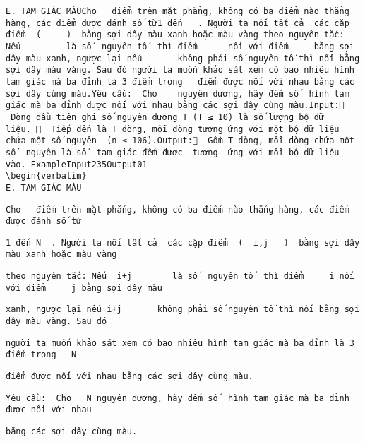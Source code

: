 
\begin{verbatim}
E. TAM GIÁC MÀUCho   điểm trên mặt phẳng, không có ba điểm nào thẳng hàng, các điểm được đánh số từ1 đến   . Người ta nối tất cả  các cặp điểm  (     )  bằng sợi dây màu xanh hoặc màu vàng theo nguyên tắc: Nếu         là số  nguyên tố  thì điểm      nối với điểm     bằng sợi dây màu xanh, ngược lại nếu       không phải số nguyên tố thì nối bằng sợi dây màu vàng. Sau đó người ta muốn khảo sát xem có bao nhiêu hình tam giác mà ba đỉnh là 3 điểm trong   điểm được nối với nhau bằng các sợi dây cùng màu.Yêu cầu:  Cho    nguyên dương, hãy đếm số  hình tam giác mà ba đỉnh được nối với nhau bằng các sợi dây cùng màu.Input:  Dòng đầu tiên ghi số nguyên dương T (T ≤ 10) là số lượng bộ dữ liệu.   Tiếp đến là T dòng, mỗi dòng tương ứng với một bộ dữ liệu chứa một số nguyên  (n ≤ 106).Output:  Gồm T dòng, mỗi dòng chứa một số  nguyên là số  tam giác đếm được  tương  ứng với mỗi bộ dữ liệu vào. ExampleInput235Output01
\begin{verbatim}
E. TAM GIÁC MÀU\end{verbatim}
\begin{verbatim}
Cho   điểm trên mặt phẳng, không có ba điểm nào thẳng hàng, các điểm được đánh số từ\end{verbatim}
\begin{verbatim}
1 đến N  . Người ta nối tất cả  các cặp điểm  (  i,j   )  bằng sợi dây màu xanh hoặc màu vàng \end{verbatim}
\begin{verbatim}
theo nguyên tắc: Nếu  i+j        là số  nguyên tố  thì điểm     i nối với điểm     j bằng sợi dây màu \end{verbatim}
\begin{verbatim}
xanh, ngược lại nếu i+j       không phải số nguyên tố thì nối bằng sợi dây màu vàng. Sau đó \end{verbatim}
\begin{verbatim}
người ta muốn khảo sát xem có bao nhiêu hình tam giác mà ba đỉnh là 3 điểm trong   N\end{verbatim}
\begin{verbatim}
điểm được nối với nhau bằng các sợi dây cùng màu.\end{verbatim}
\begin{verbatim}
Yêu cầu:  Cho   N nguyên dương, hãy đếm số  hình tam giác mà ba đỉnh được nối với nhau \end{verbatim}
\begin{verbatim}
bằng các sợi dây cùng màu.\end{verbatim}
